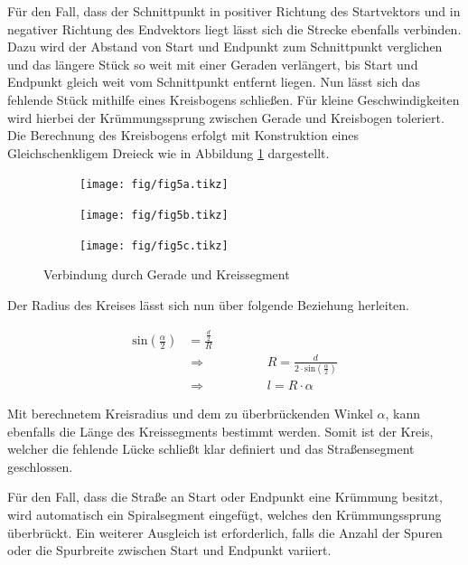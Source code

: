 Für den Fall, dass der Schnittpunkt in positiver Richtung des Startvektors und in negativer Richtung des Endvektors liegt lässt sich die Strecke ebenfalls verbinden. Dazu wird der Abstand von Start und Endpunkt zum Schnittpunkt verglichen und das längere Stück so weit mit einer Geraden verlängert, bis Start und Endpunkt gleich weit vom Schnittpunkt entfernt liegen. Nun lässt sich das fehlende Stück mithilfe eines Kreisbogens schließen. Für kleine Geschwindigkeiten wird hierbei der Krümmungssprung zwischen Gerade und Kreisbogen toleriert. Die Berechnung des Kreisbogens erfolgt mit Konstruktion eines Gleichschenkligem Dreieck wie in Abbildung \ref{abb5} dargestellt.

\begin{figure}[H]
\flushleft
\begin{subfigure}{0.32\textwidth}
\texttt{[image: fig/fig5a.tikz]}
\end{subfigure}
\begin{subfigure}{0.32\textwidth}
    \texttt{[image: fig/fig5b.tikz]}
\end{subfigure}
\begin{subfigure}{0.32\textwidth}
    \texttt{[image: fig/fig5c.tikz]}
\end{subfigure}
\caption{Verbindung durch Gerade und Kreissegment}
\label{abb5}
\end{figure}

Der Radius des Kreises lässt sich nun über folgende Beziehung herleiten.

\begin{align}
\text{sin}(\frac{\alpha}{2}) &= \frac{\frac{d}{2}}{R} \\
&\Rightarrow \hspace{2cm} R = \frac{d}{2 \cdot \text{sin}(\frac{\alpha}{2})} \\
&\Rightarrow \hspace{2cm} l = R \cdot \alpha
\end{align}

Mit berechnetem Kreisradius und dem zu überbrückenden Winkel \(\alpha\), kann  ebenfalls die Länge des Kreissegments bestimmt werden. Somit ist der Kreis, welcher die fehlende Lücke schließt klar definiert und das Straßensegment geschlossen.

Für den Fall, dass die Straße an Start oder Endpunkt eine Krümmung besitzt, wird automatisch ein Spiralsegment eingefügt, welches den Krümmungssprung überbrückt. Ein weiterer Ausgleich ist erforderlich, falls die Anzahl der Spuren oder die Spurbreite zwischen Start und Endpunkt variiert.

